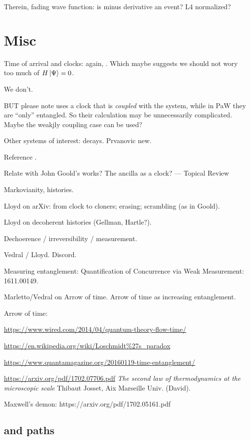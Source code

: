 Therein, fading wave function: is minus derivative an event?
L4 normalized?


\section{Misc}

Time of arrival and clocks: again, \cite{YearsleyHalliwell_Clocks}.
Which maybe suggests we should not wory too much of $H\ket{\Psi} = 0$. 

We don't. 

BUT please note \cite{YearsleyHalliwell_Clocks} uses a clock that is
\emph{coupled} with the system, while in PaW they are ``only'' entangled.
So their calculation may be unnecessarily complicated.
Maybe the weakjly coupling case can be used?

Other systems of interest: decays. Prvanovic new.

Reference \cite{ConnesRovelliThermo}.

Relate with John Goold's works? The ancilla as a clock? --- Topical Review

Markovianity, histories.

Lloyd on arXiv: from clock to cloners; erasing; scrambling (as in Goold).

Lloyd on decoherent histories (Gellman, Hartle?).

Dechoerence / irreversibility / measurement.

Vedral / Lloyd. Discord.

Measuring entanglement: Quantification of Concurrence via Weak Measurement: 1611.00149.

Marletto/Vedral on Arrow of time. Arrow of time as increasing entanglement.

Arrow of time: 

\url{https://www.wired.com/2014/04/quantum-theory-flow-time/}

\url{https://en.wikipedia.org/wiki/Loschmidt%27s_paradox}

\url{https://www.quantamagazine.org/20160119-time-entanglement/}

\url{https://arxiv.org/pdf/1702.07706.pdf} \textit{The second law of thermodynamics at the microscopic scale}
Thibaut Josset,
Aix Marseille Univ. (David).

Maxwell's demon: https://arxiv.org/pdf/1702.05161.pdf

\subsection{and paths}

